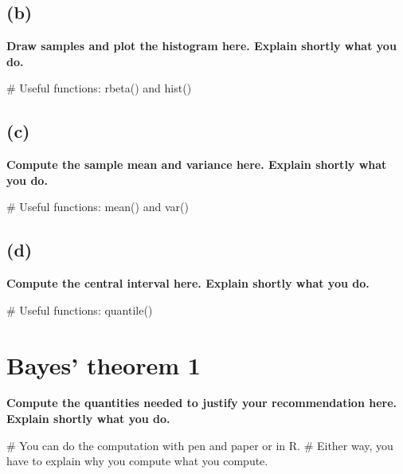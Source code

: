 \documentclass[
]{article}
\newenvironment{Shaded}{\begin{snugshade}}{\end{snugshade}}
\newcommand{\CommentTok}[1]{\textcolor[rgb]{0.37,0.37,0.37}{#1}}
\begin{document}
\hypertarget{b}{%
\subsection{(b)}\label{b}}

\textbf{Draw samples and plot the histogram here. Explain shortly what
you do.}

\begin{Shaded}
\begin{Highlighting}[]
\CommentTok{\# Useful functions: rbeta() and hist()}
\end{Highlighting}
\end{Shaded}

\hypertarget{c}{%
\subsection{(c)}\label{c}}

\textbf{Compute the sample mean and variance here. Explain shortly what
you do.}

\begin{Shaded}
\begin{Highlighting}[]
\CommentTok{\# Useful functions: mean() and var()}
\end{Highlighting}
\end{Shaded}

\hypertarget{d}{%
\subsection{(d)}\label{d}}

\textbf{Compute the central interval here. Explain shortly what you do.}

\begin{Shaded}
\begin{Highlighting}[]
\CommentTok{\# Useful functions: quantile()}
\end{Highlighting}
\end{Shaded}

\hypertarget{bayes-theorem-1}{%
\section{Bayes' theorem 1}\label{bayes-theorem-1}}

\textbf{Compute the quantities needed to justify your recommendation
here. Explain shortly what you do.}

\begin{Shaded}
\begin{Highlighting}[]
\CommentTok{\# You can do the computation with pen and paper or in R. }
\CommentTok{\# Either way, you have to explain why you compute what you compute.}
\end{Highlighting}
\end{Shaded}
\end{document}

